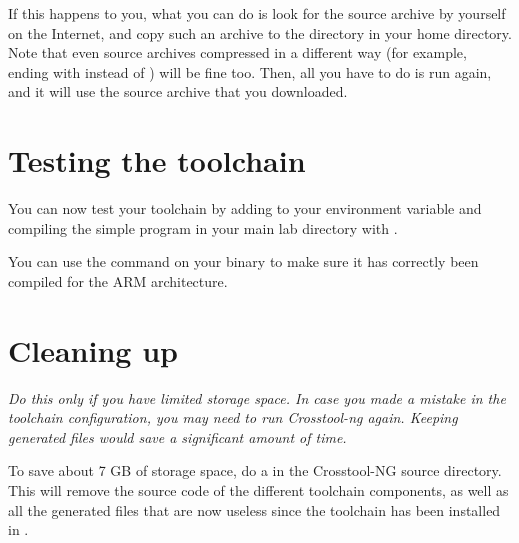 If this happens to you, what you can do is look for the source archive by
yourself on the Internet, and copy such an archive to the 
directory in your home directory. Note that even source archives
compressed in a different way (for example, ending with 
instead of ) will be fine too. Then, all you have to do is run
 again, and it will use the source archive that you
downloaded.

\section{Testing the toolchain}

You can now test your toolchain by adding
 to your
 environment variable and compiling the simple
 program in your main lab directory with
.

You can use the  command on your binary to make sure it has
correctly been compiled for the ARM architecture.

\section{Cleaning up}

{\em Do this only if you have limited storage space. In case you made a
mistake in the toolchain configuration, you may need to run Crosstool-ng
again. Keeping generated files would save a significant amount of time.}

To save about 7 GB of storage space, do a  in the
Crosstool-NG source directory. This will remove the source code of the
different toolchain components, as well as all the generated files
that are now useless since the toolchain has been installed in
.
